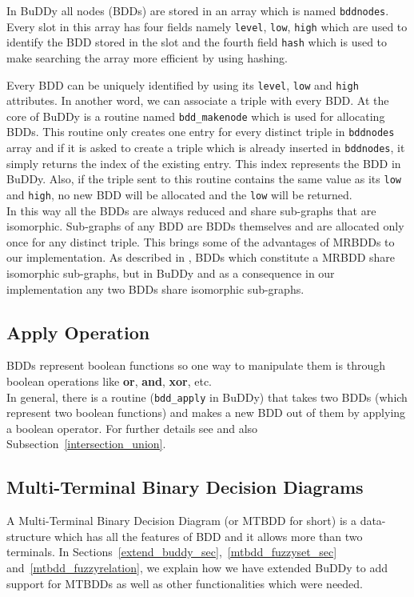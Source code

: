 \documentclass[4pt]{article}
\begin{document}
In BuDDy all nodes (BDDs) are stored in an array which is named \verb=bddnodes=. Every slot in this array has four fields namely \verb=level=, \verb=low=, \verb=high= which are used to identify the BDD stored in the slot and the fourth field \verb=hash= which is used to make searching the array more efficient by using hashing.

Every BDD can be uniquely identified by using its \verb=level=, \verb=low= and \verb=high= attributes. In another word, we can associate a triple  with every BDD. At the core of BuDDy is a routine named \verb=bdd_makenode= which is used for allocating BDDs. This routine only creates one entry for every distinct triple in \verb=bddnodes= array and if it is asked to create a triple which is already inserted in \verb=bddnodes=, it simply returns the index of the existing entry. This index represents the BDD in BuDDy. Also, if the triple sent to this routine contains the same value as its \verb=low= and \verb=high=, no new BDD will be allocated and the \verb=low= will be returned.\\
In this way all the BDDs are always reduced and share sub-graphs that are isomorphic. Sub-graphs of any BDD are BDDs themselves and are allocated only once for any distinct triple. This brings some of the advantages of MRBDDs to our implementation. As described in \cite{mrbdd}, BDDs which constitute a MRBDD share isomorphic sub-graphs, but in BuDDy and as a consequence in our implementation any two BDDs share isomorphic sub-graphs.


\subsection{Apply Operation}
BDDs represent boolean functions so one way to manipulate them is through boolean operations like \textbf{or}, \textbf{and}, \textbf{xor}, etc.\\
In general, there is a routine (\verb=bdd_apply= in BuDDy) that takes two BDDs (which represent two boolean functions) and makes a new BDD out of them by applying a boolean operator. For further details see \cite{bdd,buddy} and also Subsection~\ref{intersection_union}.


\subsection{Multi-Terminal Binary Decision Diagrams}
\label{mtbdd_sec}
A Multi-Terminal Binary Decision Diagram (or MTBDD for short) is a data-structure which has all the features of BDD and it allows more than two terminals. In Sections~\ref{extend_buddy_sec},~\ref{mtbdd_fuzzyset_sec} and~\ref{mtbdd_fuzzyrelation}, we explain how we have extended BuDDy to add support for MTBDDs as well as other functionalities which were needed.
\end{document}
